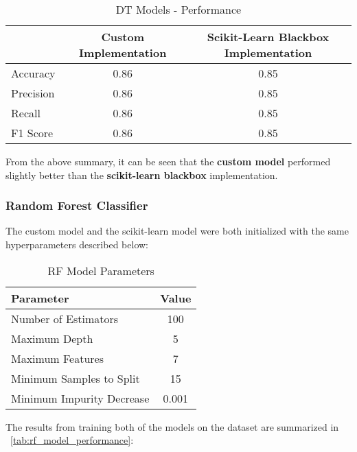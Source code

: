 \begin{table}[h!]
  \centering
  \begin{tabular}{lcc}
    \toprule
              & \textbf{Custom Implementation} & \textbf{Scikit-Learn Blackbox Implementation} \\
    \midrule
    Accuracy  & 0.86                           & 0.85                                          \\
    Precision & 0.86                           & 0.85                                          \\
    Recall    & 0.86                           & 0.85                                          \\
    F1 Score  & 0.86                           & 0.85                                          \\
    \bottomrule
  \end{tabular}
  \caption{DT Models - Performance}
  \label{tab:dt_model_performance}
\end{table}

From the above summary, it can be seen that the \textbf{custom model} performed slightly better than the \textbf{scikit-learn blackbox} implementation.

\subsubsection{Random Forest Classifier}

The custom model and the scikit-learn model were both initialized with the same hyperparameters described below:

\begin{table}[H]
  \centering
  \begin{tabular}{lc}
    \toprule
    \textbf{Parameter}        & \textbf{Value} \\
    \midrule
    Number of Estimators      & 100            \\
    Maximum Depth             & 5              \\
    Maximum Features          & 7              \\
    Minimum Samples to Split  & 15             \\
    Minimum Impurity Decrease & 0.001          \\
    \bottomrule
  \end{tabular}
  \caption{RF Model Parameters}
  \label{tab:rf_modelparams}
\end{table}

The results from training both of the models on the dataset are summarized in ~\autoref{tab:rf_model_performance}:

